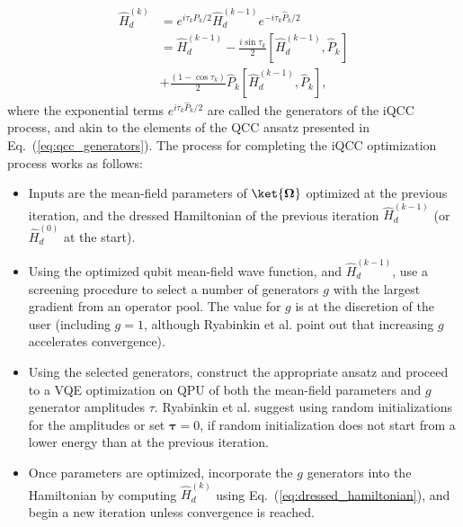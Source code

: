 \begin{align} \label{eq:dressed_hamiltonian}
    \hat{H}_d^{(k)} &= e^{i\tau_k \hat{P}_k / 2} \hat{H}_d^{(k-1)} e^{-i\tau_k \hat{P}_k / 2} \nonumber \\
    & = \hat{H}_d^{(k-1)} - \frac{i \sin{\tau_k}}{2} \left[\hat{H}_d^{(k-1)}, \hat{P}_k \right] \nonumber \\
    & + \frac{(1 - \cos{\tau_k})}{2} \hat{P}_k \left[\hat{H}_d^{(k-1)}, \hat{P}_k \right],
\end{align}
where the exponential terms $e^{i\tau_k \hat{P}_k / 2}$ are called the generators of the iQCC process, and akin to the elements of the QCC ansatz presented in Eq.~(\ref{eq:qcc_generators}). The process for completing the iQCC optimization process works as follows:
\begin{itemize}
    \item Inputs are the mean-field parameters of $\ket{\boldsymbol{\Omega}}$ optimized at the previous iteration, and the dressed Hamiltonian of the previous iteration  $\hat{H}_d^{(k-1)}$ (or $\hat{H}_d^{(0)}$ at the start).
    \item Using the optimized qubit mean-field wave function, and $\hat{H}_d^{(k-1)}$, use a screening procedure to select a number of generators $g$ with the largest gradient from an operator pool. The value for $g$ is at the discretion of the user (including $g=1$, although Ryabinkin et al. \cite{Ryabinkin2020} point out that increasing $g$ accelerates convergence).
    \item Using the selected generators, construct the appropriate ansatz and proceed to a VQE optimization on QPU of both the mean-field parameters and $g$ generator amplitudes $\tau$. Ryabinkin et al. \cite{Ryabinkin2020} suggest using random initializations for the amplitudes or set $\boldsymbol{\tau}= 0$, if random initialization does not start from a lower energy than at the previous iteration.
    \item Once parameters are optimized, incorporate the $g$ generators into the Hamiltonian by computing $\hat{H}_d^{(k)}$ using Eq.~(\ref{eq:dressed_hamiltonian}), and begin a new iteration unless convergence is reached.
\end{itemize}

